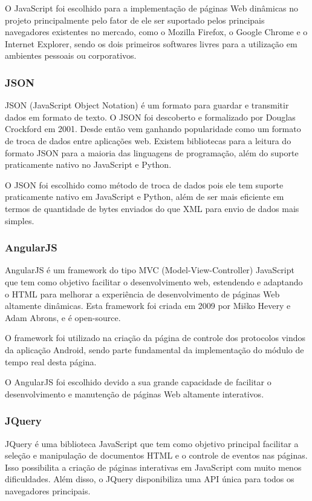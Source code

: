 \documentclass[
	article,			%
	11pt,				%
	oneside,			%
	a4paper,			%
	english,			%
	brazil,				%
	sumario=tradicional
	]{abntex2}
\begin{document}
O JavaScript foi escolhido para a implementação de páginas Web dinâmicas no projeto principalmente pelo fator de ele ser suportado pelos principais navegadores existentes no mercado, como o Mozilla Firefox, o Google Chrome e o Internet Explorer, sendo os dois primeiros softwares livres para a utilização em ambientes pessoais ou corporativos.

\subsubsection{JSON}

JSON (JavaScript Object Notation) é um formato para guardar e transmitir dados em formato de texto.
O JSON foi descoberto e formalizado por Douglas Crockford em 2001. \cite{json}
Desde então vem ganhando popularidade como um formato de troca de dados entre aplicações web.
Existem bibliotecas para a leitura do formato JSON para a maioria das linguagens de programação, além do suporte praticamente nativo no JavaScript e Python.

O JSON foi escolhido como método de troca de dados pois ele tem suporte praticamente nativo em JavaScript e Python, além de ser mais eficiente em termos de quantidade de bytes enviados do que XML para envio de dados mais simples.

\subsubsection{AngularJS}

AngularJS é um framework do tipo MVC (Model-View-Controller) JavaScript que tem como objetivo facilitar o desenvolvimento web, estendendo e adaptando o HTML para melhorar a experiência de desenvolvimento de páginas Web altamente dinâmicas.
Esta framework foi criada em 2009 por Miško Hevery e Adam Abrons, e é open-source. \cite{angularjs}

O framework foi utilizado na criação da página de controle dos protocolos vindos da aplicação Android, sendo parte fundamental da implementação do módulo de tempo real desta página.

O AngularJS foi escolhido devido a sua grande capacidade de facilitar o desenvolvimento e manutenção de páginas Web altamente interativos.

\subsubsection{JQuery}

JQuery é uma biblioteca JavaScript que tem como objetivo principal facilitar a seleção e manipulação de documentos HTML e o controle de eventos nas páginas.
Isso possibilita a criação de páginas interativas em JavaScript com muito menos dificuldades.
Além disso, o JQuery disponibiliza uma API única para todos os navegadores principais. \cite{jquery}
\end{document}
